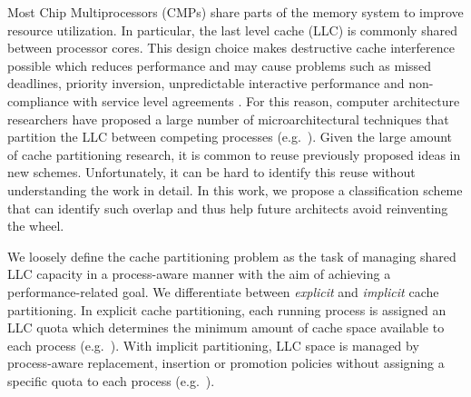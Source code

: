 Most Chip Multiprocessors (CMPs) share parts of the memory system to improve resource utilization.
In particular, the last level cache (LLC) is commonly shared between processor cores.
This design choice makes destructive cache interference possible which reduces performance and may cause problems such as missed deadlines, priority inversion, unpredictable interactive performance and non-compliance with service level agreements \cite{dubois13}.
For this reason, computer architecture researchers have proposed a large number of microarchitectural techniques that partition the LLC between competing processes (e.g.\ \cite{suh02,dynPartofSharedCacheMemory,utilityBasedCachePartitioning,haakonHiPC,jaleel08,xie09,jaleel10,xie10,manikantan11,sanchez11,sundararajan12,manikantan12,duong12,hasenplaugh12,albericio13}).
Given the large amount of cache partitioning research, it is common to reuse previously proposed ideas in new schemes.
Unfortunately, it can be hard to identify this reuse without understanding the work in detail.
In this work, we propose a classification scheme that can identify such overlap and thus help future architects avoid reinventing the wheel.

We loosely define the cache partitioning problem as the task of managing shared LLC capacity in a process-aware manner with the aim of achieving a performance-related goal.
We differentiate between \textit{explicit} and \textit{implicit} cache partitioning.
In explicit cache partitioning, each running process is assigned an LLC quota which determines the minimum amount of cache space available to each process (e.g.\ \cite{suh02,dynPartofSharedCacheMemory,utilityBasedCachePartitioning,haakonHiPC,xie09}).
With implicit partitioning, LLC space is managed by process-aware replacement, insertion or promotion policies without assigning a specific quota to each process (e.g.\ \cite{jaleel08,jaleel10,manikantan11,albericio13}).


